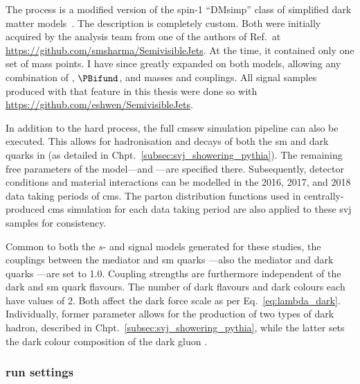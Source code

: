 The \schannel process is a modified version of the spin-1 ``DMsimp'' class of simplified dark matter models~\cite{Backovic:2015soa}. The \tchannel description is completely custom. Both were initially acquired by the analysis team from one of the authors of Ref.~at \url{https://github.com/smsharma/SemivisibleJets}. At the time, it contained only one set of mass points. I have since greatly expanded on both models, allowing any combination of \PZprime, $\PBifund$, and \Pqdark masses and couplings. All signal samples produced with \MADGRAPH that feature in this thesis were done so with \url{https://github.com/eshwen/SemivisibleJets}. %

In addition to the hard process, the full \acrshort{cmssw} simulation pipeline can also be executed. This allows for hadronisation and decays of both the \acrshort{sm} and dark quarks in \PYTHIA (as detailed in Chpt.~\ref{subsec:svj_showering_pythia}). The remaining free parameters of the model---\aDark and \rinv---are specified there. Subsequently, detector conditions and material interactions can be modelled in the 2016, 2017, and 2018 data taking periods of \acrshort{cms}. The parton distribution functions used in centrally-produced \acrshort{cms} simulation for each data taking period are also applied to these \gls{svj} samples for consistency.

Common to both the $s$- and \tchannel signal models generated for these studies, the couplings between the mediator and \acrshort{sm} quarks \gq---also the mediator and dark quarks \gqdark---are set to 1.0. Coupling strengths are furthermore independent of the dark and \acrshort{sm} quark flavours. The number of dark flavours \Nf and dark colours \Nc each have values of 2. Both affect the dark force scale as per Eq.~\ref{eq:lambda_dark}. Individually, former parameter allows for the production of two types of dark hadron, described in Chpt.~\ref{subsec:svj_showering_pythia}, while the latter sets the dark colour composition of the dark gluon \Pgdark. 




\subsubsection{\texorpdfstring{\MADGRAPH}{MadGraph} run settings}
\label{subsubsec:svj_mg_run_settings}

